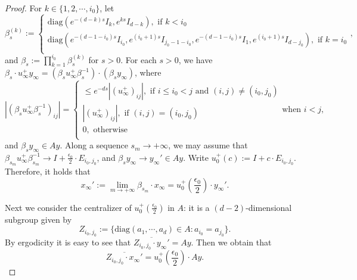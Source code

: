 \documentclass[10pt,a4paper]{amsart}
\newcommand{\diag}{\mathrm{diag}}
\begin{document}
\begin{proof}
	For $k\in \{1,2,\cdots,i_0\}$, let \begin{equation*}
		\beta_s^{(k)}:=
		\begin{cases}
			\diag(e^{-(d-k)s}I_{k},e^{ks}I_{d-k}), \text{ if }k<i_0\\ 
			\diag(e^{-(d-1-i_0)s}I_{i_0},e^{(i_0+1)s}I_{j_0-1-i_0},e^{-(d-1-i_0)s}I_1,e^{(i_0+1)s}I_{d-j_0}), \text{ if }k=i_0\\ 
		\end{cases},
	\end{equation*}
	and $\beta_s:=\prod\limits_{k=1}^{i_0}\beta^{(k)}_s$ for $s>0$.
	For each $s>0$, we have $\beta_s\cdot u_\infty^+y_\infty=(\beta_s u_\infty^+\beta_s^{-1})\cdot (\beta_sy_\infty)$, where 
	\begin{equation*}
		|(\beta_su_\infty^+\beta_s^{-1})_{ij}|=\begin{cases}
			\leq e^{-ds}|(u_\infty^+)_{ij}|, \text{ if }i\leq i_0<j \text{ and } (i,j)\neq (i_0,j_0)\\
			|(u_\infty^+)_{ij}|, \text{ if } (i,j)=(i_0,j_0)\\
			0,\text{ otherwise }\\
		\end{cases}
		\text{when }i<j,
	\end{equation*}
	and $\beta_sy_{\infty}\in Ay$. Along a sequence $s_m\to +\infty$, we may assume that 
	$\beta_{s_m}u_\infty^+\beta_{s_m}^{-1}\to I+\frac{\epsilon_0}{2}\cdot E_{i_0,j_0}$, and $\beta_sy_{\infty}\to y_{\infty}'\in Ay$. Write $u_0^+(c):=I+c\cdot E_{i_0,j_0}$. Therefore, it holds that \begin{equation*}
		x_{\infty}':=\lim\limits_{m\to +\infty}\beta_{s_m}\cdot x_{\infty}=u_0^+(\frac{\epsilon_0}{2})\cdot y_{\infty}'.
	\end{equation*}
	
	Next we consider the centralizer of $u_0^+(\frac{\epsilon_0}{2})$ in $A$: it is a $(d-2)$-dimensional subgroup given by \begin{equation*}
		Z_{i_0,j_0}:=\{\diag(a_1,\cdots,a_d)\in A:a_{i_0}=a_{j_0}\}.
	\end{equation*}
	By ergodicity it is easy to see that $\overline{Z_{i_0,j_0}\cdot y_{\infty}'}=Ay$. Then we obtain that \begin{equation*}
		\overline{Z_{i_0,j_0}\cdot x_{\infty}'}=u_0^+(\frac{\epsilon_0}{2})\cdot Ay.
	\end{equation*}
	

\end{proof}
\end{document}
